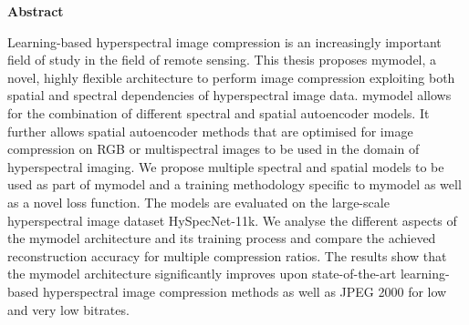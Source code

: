 \thispagestyle{empty}
\vspace*{1.4cm}

\begin{center}
    {\Large \textbf{Abstract}}
\end{center}

\vspace*{0.5cm}

\noindent
Learning-based hyperspectral image compression is an increasingly important field of study in the field of remote sensing. This thesis proposes \ac{mymodel}, a novel, highly flexible architecture to perform image compression exploiting both spatial and spectral dependencies of hyperspectral image data. \ac{mymodel} allows for the combination of different spectral and spatial autoencoder models. It further allows spatial autoencoder methods that are optimised for image compression on RGB or multispectral images to be used in the domain of hyperspectral imaging. We propose multiple spectral and spatial models to be used as part of \ac{mymodel} and a training methodology specific to \ac{mymodel} as well as a novel loss function. The models are evaluated on the large-scale hyperspectral image dataset HySpecNet-11k. We analyse the different aspects of the \ac{mymodel} architecture and its training process and compare the achieved reconstruction accuracy for multiple compression ratios. The results show that the \ac{mymodel} architecture significantly improves upon state-of-the-art learning-based hyperspectral image compression methods as well as JPEG 2000 for low and very low bitrates.
\\